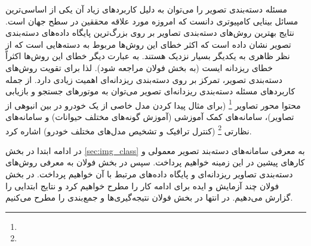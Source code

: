 \documentclass[11pt]{article}
\begin{document}
مسئله دسته‌بندی تصویر را می‌توان به دلیل کاربردهای زیاد آن یکی از اساسی‌ترین مسائل بینایی کامپیوتری دانست که امروزه مورد علاقه محققین در سطح جهان است. نتایج بهترین روش‌های دسته‌بندی تصاویر بر روی بزرگ‌ترین پایگاه داده‌های دسته‌بندی تصویر نشان داده است که اکثر خطای این روش‌ها مربوط به دسته‌هایی است که از نظر ظاهری به یکدیگر بسیار نزدیک هستند. به عبارت دیگر خطای این روش‌ها اکثراً خطای ریزدانه ایست (به بخش فولان مراجعه شود). لذا برای تقویت روش‌های دسته‌بندی تصویر، تمرکز بر روی دسته‌بندی ریزدانه‌ای اهمیت زیادی دارد.
از جمله کاربردهای مسئله دسته‌بندی ریزدانه‌ای تصویر می‌توان به موتورهای جستجو و بازیابی محتوا محور تصاویر
\footnote{}
(برای مثال پیدا کردن مدل خاصی از یک خودرو در بین انبوهی از تصاویر)، سامانه‌های کمک آموزشی (آموزش گونه‌های مختلف حیوانات) و سامانه‌های نظارتی
\footnote{}
(کنترل ترافیک و تشخیص مدل‌های مختلف خودرو) اشاره کرد.

در ادامه ابتدا در بخش
\ref{sec:img_class}
به معرفی سامانه‌های دسته‌بند تصویر معمولی و کارهای پیشین در این زمینه خواهیم پرداخت. سپس در بخش فولان به معرفی روش‌های دسته‌بندی تصاویر ریزدانه‌ای و پایگاه داده‌های مرتبط با آن خواهیم پرداخت. در بخش فولان چند آزمایش و ایده برای ادامه کار را مطرح خواهیم کرد و نتایج ابتدایی را گزارش می‌دهیم. در انتها در بخش فولان نتیجه‌گیری‌ها و جمع‌بندی را مطرح می‌کنیم.

\end{document}
